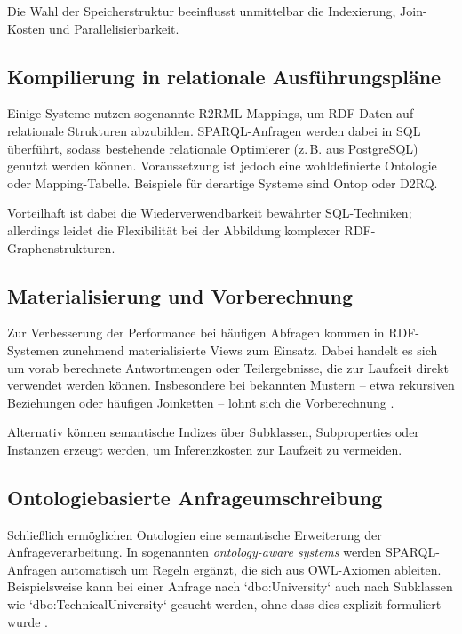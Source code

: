 \documentclass[12pt]{article}
\begin{document}
Die Wahl der Speicherstruktur beeinflusst unmittelbar die Indexierung, Join-Kosten und Parallelisierbarkeit.

\subsection{Kompilierung in relationale Ausführungspläne}

Einige Systeme nutzen sogenannte R2RML-Mappings, um RDF-Daten auf relationale Strukturen abzubilden. SPARQL-Anfragen werden dabei in SQL überführt, sodass bestehende relationale Optimierer (z.\,B. aus PostgreSQL) genutzt werden können. Voraussetzung ist jedoch eine wohldefinierte Ontologie oder Mapping-Tabelle. Beispiele für derartige Systeme sind Ontop oder D2RQ.

Vorteilhaft ist dabei die Wiederverwendbarkeit bewährter SQL-Techniken; allerdings leidet die Flexibilität bei der Abbildung komplexer RDF-Graphenstrukturen.

\subsection{Materialisierung und Vorberechnung}

Zur Verbesserung der Performance bei häufigen Abfragen kommen in RDF-Systemen zunehmend materialisierte Views zum Einsatz. Dabei handelt es sich um vorab berechnete Antwortmengen oder Teilergebnisse, die zur Laufzeit direkt verwendet werden können. Insbesondere bei bekannten Mustern – etwa rekursiven Beziehungen oder häufigen Joinketten – lohnt sich die Vorberechnung \cite{elzein2019materialized}.

Alternativ können semantische Indizes über Subklassen, Subproperties oder Instanzen erzeugt werden, um Inferenzkosten zur Laufzeit zu vermeiden.

\subsection{Ontologiebasierte Anfrageumschreibung}

Schließlich ermöglichen Ontologien eine semantische Erweiterung der Anfrageverarbeitung. In sogenannten \textit{ontology-aware systems} werden SPARQL-Anfragen automatisch um Regeln ergänzt, die sich aus OWL-Axiomen ableiten. Beispielsweise kann bei einer Anfrage nach `dbo:University` auch nach Subklassen wie `dbo:TechnicalUniversity` gesucht werden, ohne dass dies explizit formuliert wurde \cite{tsatsanifos2012ontologies}.
\end{document}
